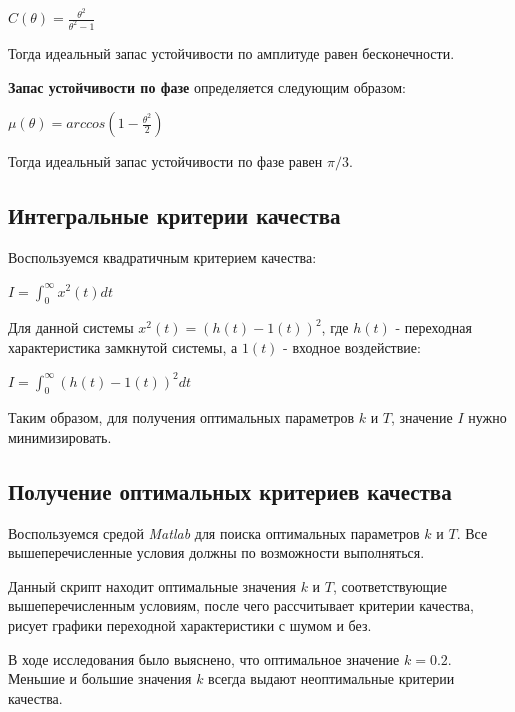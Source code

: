 \documentclass[14pt,a4paper,report]{report}
\begin{document}
\begin{center}
$C(\theta)=\frac{\theta^2}{\theta^2-1}$
\end{center}

Тогда идеальный запас устойчивости по амплитуде равен бесконечности.

\textbf{Запас устойчивости по фазе} определяется следующим образом:

\begin{center}
$\mu(\theta)=arccos(1-\frac{\theta^2}{2})$
\end{center}

Тогда идеальный запас устойчивости по фазе равен $\pi/3$.

\subsection{Интегральные критерии качества}

Воспользуемся квадратичным критерием качества:

\begin{center}
$I=\int_{0}^{\infty}x^2(t)dt$
\end{center}

Для данной системы $x^2(t)=(h(t)-1(t))^2$, где $h(t)$ - переходная характеристика замкнутой системы, а $1(t)$ - входное воздействие:

\begin{center}
$I=\int_{0}^{\infty}(h(t)-1(t))^2dt$
\end{center}

Таким образом, для получения оптимальных параметров $k$ и $T$, значение $I$  нужно минимизировать.

\subsection{Получение оптимальных критериев качества}

Воспользуемся средой \emph{Matlab} для поиска оптимальных параметров $k$ и $T$. Все вышеперечисленные условия должны по возможности выполняться.



Данный скрипт находит оптимальные значения $k$ и $T$, соответствующие вышеперечисленным условиям, после чего рассчитывает критерии качества, рисует графики переходной характеристики с шумом и без.

В ходе исследования было выяснено, что оптимальное значение $k=0.2$. Меньшие и большие значения $k$ всегда выдают неоптимальные критерии качества.
\end{document}
